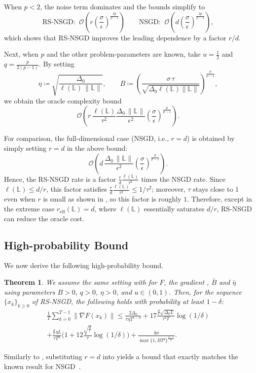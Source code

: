 \documentclass[10pt]{article}
\newtheorem{theorem}{Theorem}[section]
\begin{document}
When $p<2$, the noise term dominates and the bounds simplify to
\[
\text{RS-NSGD: }\ \mathcal{O}\!\left(r\left(\frac{\sigma}{\epsilon}\right)^{\frac{2p}{p-1}}\right)
\qquad
\text{NSGD: }\ \mathcal{O}\!\left(d\left(\frac{\sigma}{\epsilon}\right)^{\frac{2p}{p-1}}\right),
\]
which shows that RS-NSGD improves the leading dependence by a factor $r/d$.




Next, when $p$ and the other problem-parameters are known, take
$u=\tfrac{1}{2}$ and $q=\tfrac{p}{2(p-1)}$.
By setting
\[
\eta \coloneqq \sqrt{\frac{\Delta_0}{\ell(\mathbb{L})\,\|\mathbb{L}\|}},
\qquad
B \coloneqq
\left(
\frac{\sigma\,\tau}{\sqrt{\Delta_0\ell(\mathbb{L})\|\mathbb{L}\|}}
\right)^{\frac{p}{p-1}},
\]
we obtain the oracle complexity bound
\[
\mathcal{O}\!\left(
r\,\frac{\ell(\mathbb{L})}{\tau^2}
\frac{\Delta_0\,\|\mathbb{L}\|}{\epsilon^{2}}
\left(\frac{\sigma}{\epsilon}\right)^{\frac{p}{p-1}}
\right).
\]

For comparison, the full-dimensional case (NSGD, i.e., $r=d$) is obtained by simply setting $r=d$ in the above bound:
\[
\mathcal{O}\!\left(
d\,
\frac{\Delta_0\,\|\mathbb{L}\|}{\epsilon^{2}}
\left(\frac{\sigma}{\epsilon}\right)^{\frac{p}{p-1}}
\right).
\]
Hence, the RS-NSGD rate is a factor $\frac{r}{d}\frac{\ell(\mathbb{L})}{\tau^2}$ times the NSGD rate. Since $\ell(\mathbb{L}) \le d/r$, this factor satisfies 
$\frac{r}{d}\frac{\ell(\mathbb{L})}{\tau^2}\le 1/\tau^2$; 
moreover, $\tau$ stays close to $1$ even when $r$ is small as shown in , so this factor is roughly $1$.
Therefore, except in the extreme case $r_{\mathrm{eff}}(\mathbb{L})=d$, where $\ell(\mathbb{L})$ essentially saturates $d/r$, RS-NSGD can reduce the oracle cost.


\subsection{High-probability Bound}
We now derive the following high-probability bound.
\begin{theorem}\label{high:minibatch-RNSGD-prob}
We assume the same setting with
 for $F$, the gradient , $\bar{B}$ and $\bar{\eta}$ using   
parameters $B > 0$, $q > 0$, $\eta > 0$, and $u \in (0,1)$.
Then, for the sequence $\{x_k\}_{k\ge 0}$ of RS-NSGD,
the following holds with probability at least $1 - \delta$:
\begin{align*}
\frac{1}{T} \sum_{k=0}^{T-1} \|\nabla F(x_k)\|
\le \frac{2 \Delta_0}{\tau \eta T^{1-u}}
+ 17\frac{\frac{d}{r} \sqrt{\Delta_0 L}}{\tau^2 T} \log (1/\delta)
\\
+ \frac{\frac{d}{r} \eta L}{\tau T^u} \big( 1 + 12\frac{\sqrt{\frac{d}{r}}}{\tau} \log (1/\delta) \big)
+ \frac{8 \sigma}{\max \{1, B T^q\}^{\frac{p-1}{p}}}.
\end{align*}
\end{theorem}
Similarly to , substituting $r = d$ into  yields a bound that exactly matches the known result for NSGD~\citep{huebler2025}.
\end{document}
